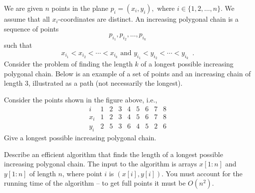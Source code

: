 We are given $n$ points in the plane
\(
p_i=(x_i,y_i),
\)
where $i\in\{1,2,\ldots,n\}$.
We assume that all $x_i$-coordinates are distinct.
%
An increasing polygonal chain is a sequence of points
\[
p_{i_1},p_{i_2},\ldots,p_{i_k}
\]
such that
\[
x_{i_1}<x_{i_2}<\cdots <x_{i_k}
\text{ and }
y_{i_1}<y_{i_2}<\cdots <y_{i_k} \enspace .
\]
Consider the problem of finding the length $k$ of a longest possible increasing polygonal chain.
Below is an example of a set of points and an increasing chain of length 3, illustrated as a path (not necessarily the longest).

\begin{center}
\end{center}

{Consider the points shown in the figure above, i.e.,
\[
\begin{array}{c|cccccccc}
i    & 1&2&3&4&5&6&7&8\\ \hline
x_i  & 1&2&3&4&5&6&7&8\\
y_i  & 2&5&3&6&4&5&2&6
\end{array}
\]
Give a longest possible increasing polygonal chain.}


{Describe an efficient algorithm that finds the length of a longest possible increasing polygonal chain.
The input to the algorithm is arrays $x[1{:}n]$ and $y[1{:}n]$ of length $n$, where point $i$ is $(x[i],y[i])$.
You must account for the running time of the algorithm -- to get full points it must be $O(n^2)$.}

